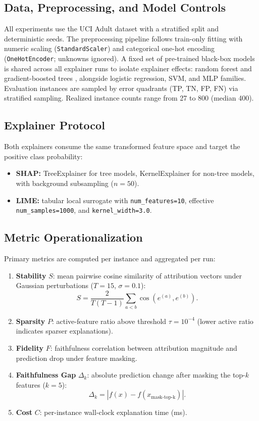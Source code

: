 \documentclass[twoside,11pt]{article}
\begin{document}
\subsection{Data, Preprocessing, and Model Controls}
\label{sec:data}

All experiments use the UCI Adult dataset \citep{kohavi1996scaling} with
a stratified split and deterministic seeds. The preprocessing pipeline
follows train-only fitting with numeric scaling (\texttt{StandardScaler})
and categorical one-hot encoding (\texttt{OneHotEncoder};
unknowns ignored). A fixed set of pre-trained black-box models is shared across all
explainer runs to isolate explainer effects: random forest \citep{breiman2001random} and
gradient-boosted trees \citep{chen2016xgboost}, alongside logistic
regression, SVM, and MLP families. Evaluation instances are sampled by
error quadrants (TP, TN, FP, FN) via stratified sampling. Realized
instance counts range from 27 to 800 (median 400).

\subsection{Explainer Protocol}
\label{sec:explainer_protocol}

Both explainers consume the same transformed feature space and target the
positive class probability:
\begin{itemize}[leftmargin=*]
\item \textbf{SHAP:} TreeExplainer for tree models, KernelExplainer for
non-tree models, with background subsampling ($n=50$).
\item \textbf{LIME:} tabular local surrogate with
\texttt{num\_features=10}, effective \texttt{num\_samples=1000}, and
\texttt{kernel\_width=3.0}.
\end{itemize}

\subsection{Metric Operationalization}
\label{sec:metrics}

Primary metrics are computed per instance and aggregated per run:
\begin{enumerate}[leftmargin=*]
\item \textbf{Stability} $S$: mean pairwise cosine similarity of
attribution vectors under Gaussian perturbations ($T=15$, $\sigma=0.1$):
\[
S = \frac{2}{T(T-1)}\sum_{a<b}\cos\!\left(e^{(a)},e^{(b)}\right).
\]
\item \textbf{Sparsity} $P$: active-feature ratio above threshold
$\tau = 10^{-4}$ (lower active ratio indicates sparser explanations).
\item \textbf{Fidelity} $F$: faithfulness correlation between attribution
magnitude and prediction drop under feature masking.
\item \textbf{Faithfulness Gap} $\Delta_k$: absolute prediction change
after masking the top-$k$ features ($k=5$):
\[
\Delta_k = \left|f(x) - f(x_{\mathrm{mask\text{-}top\text{-}k}})\right|.
\]
\item \textbf{Cost} $C$: per-instance wall-clock explanation time (ms).
\end{enumerate}
\end{document}
